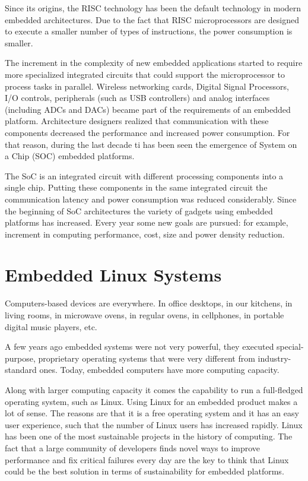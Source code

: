 Since its origins, the RISC technology has been the default technology in
modern embedded architectures. Due to the fact that RISC
microprocessors are designed to execute a smaller number of types of 
instructions, the power consumption is smaller.

The increment in the complexity of new embedded applications started to
require more specialized integrated circuits that could support the microprocessor
to process tasks in parallel. Wireless networking cards, Digital Signal
Processors, I/O controls, peripherals (such as USB controllers) and analog
interfaces (including ADCs and DACs) became part of the requirements of an
embedded platform. Architecture designers realized that communication with 
these components decreased the performance and increased power consumption. For
that reason, during the last decade ti has been seen the emergence
of System on a Chip (SOC)  embedded platforms. 

The SoC is an integrated circuit with different processing components into a single chip.
Putting these components in the same integrated circuit the communication
latency and power consumption was reduced considerably. Since the beginning of 
SoC architectures the variety of gadgets using embedded platforms has
increased. Every year some new goals are pursued: for example, increment in
computing performance, cost,  size and power density reduction.

\section{Embedded Linux Systems}

Computers-based devices are everywhere. In office desktops, in our kitchens, in
living rooms, in microwave ovens, in regular ovens, in cellphones, in portable
digital music players, etc. 

A few years ago embedded systems were not very powerful, they executed
special-purpose, proprietary operating systems that were very different
from industry-standard ones. Today, embedded computers have more computing
capacity. 

Along with larger computing capacity it comes the capability to run a full-fledged operating
system, such as Linux. Using Linux for an embedded product
makes a lot of sense. The reasons are that it is a free operating system and it
has an easy user experience, such that the number of Linux users has increased 
rapidly. Linux has been one of the most sustainable projects in the history of computing. The fact that a
large community of developers finds novel ways to improve performance and fix
critical failures every day are the key to think that Linux could be the best
solution in terms of sustainability for embedded platforms.


